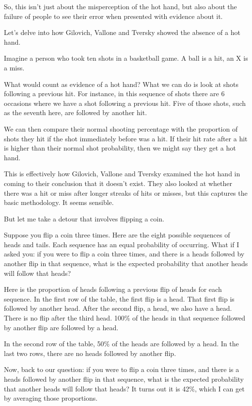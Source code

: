 \documentclass[
]{book}
\begin{document}
So, this isn't just about the misperception of the hot hand, but also about the failure of people to see their error when presented with evidence about it.

Let's delve into how Gilovich, Vallone and Tversky showed the absence of a hot hand.

Imagine a person who took ten shots in a basketball game. A ball is a hit, an X is a miss.

What would count as evidence of a hot hand? What we can do is look at shots following a previous hit. For instance, in this sequence of shots there are 6 occasions where we have a shot following a previous hit. Five of those shots, such as the seventh here, are followed by another hit.

We can then compare their normal shooting percentage with the proportion of shots they hit if the shot immediately before was a hit. If their hit rate after a hit is higher than their normal shot probability, then we might say they get a hot hand.

This is effectively how Gilovich, Vallone and Tversky examined the hot hand in coming to their conclusion that it doesn't exist. They also looked at whether there was a hit or miss after longer streaks of hits or misses, but this captures the basic methodology. It seems sensible.

But let me take a detour that involves flipping a coin.

Suppose you flip a coin three times. Here are the eight possible sequences of heads and tails. Each sequence has an equal probability of occurring. What if I asked you: if you were to flip a coin three times, and there is a heads followed by another flip in that sequence, what is the expected probability that another heads will follow that heads?

Here is the proportion of heads following a previous flip of heads for each sequence. In the first row of the table, the first flip is a head. That first flip is followed by another head. After the second flip, a head, we also have a head. There is no flip after the third head. 100\% of the heads in that sequence followed by another flip are followed by a head.

In the second row of the table, 50\% of the heads are followed by a head. In the last two rows, there are no heads followed by another flip.

Now, back to our question: if you were to flip a coin three times, and there is a heads followed by another flip in that sequence, what is the expected probability that another heads will follow that heads? It turns out it is 42\%, which I can get by averaging those proportions.
\end{document}
